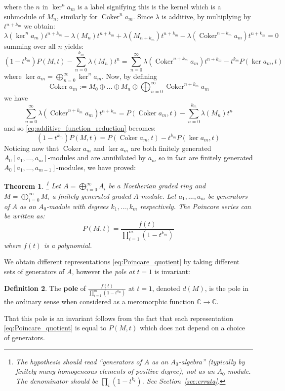 \documentclass[12pt]{article}
\theoremstyle{plain}
\newtheorem{thm}{Theorem}[subsection] %
\theoremstyle{definition}
\newtheorem{defn}[thm]{Definition} %
\newcommand{\bb}[1]{\mathbb{#1}}
\newcommand{\lto}{\longrightarrow}
\begin{document}
where the $n$ in $\ker^n a_m$ is a label signifying this is the kernel which is a submodule of $M_n$, similarly for $\operatorname{Coker}^n a_m$. Since $\lambda$ is additive, by multiplying by $t^{n+k_m}$ we obtain:
\[\lambda (\ker^n a_m)t^{n+k_m} - \lambda (M_n)t^{n+k_m} + \lambda (M_{n+k_m})t^{n+k_m} - \lambda (\operatorname{Coker}^{n + k_m} a_{m})t^{n + k_m} = 0\]
summing over all $n$ yields:
\begin{equation}
\label{eq:additive_function_reduction}
    (1 - t^{k_m})P(M,t) - \sum_{n = 0}^{k_m}\lambda(M_n)t^n = \sum_{n = 0}^\infty\lambda (\operatorname{Coker}^{n + k_m} a_{m})t^{n + k_m} - t^{k_m}P(\ker a_m, t)
\end{equation}
where $\ker a_m = \bigoplus_{n = 0}^\infty \ker^n a_m$. Now, by defining
\[\operatorname{Coker }a_m := M_0 \oplus \hdots \oplus M_n \oplus \bigoplus_{n = 0}^\infty \operatorname{Coker}^{n+k_m}a_m\]
we have
\[
\label{eq:clever_graded_module} \sum_{n = 0}^\infty\lambda (\operatorname{Coker}^{n + k_m} a_{m})t^{n + k_m} = P(\operatorname{Coker}a_m,t) - \sum_{n = 0}^{k_m}\lambda(M_n)t^n
\]
and so \eqref{eq:additive_function_reduction} becomes:
\begin{equation}
    \label{eq:generation_reduction} (1 - t^{k_m})P(M,t) = P(\operatorname{Coker}a_m,t) - t^{k_m}P(\ker a_m, t)
\end{equation}
Noticing now that $\operatorname{Coker}a_m$ and $\ker a_m$ are both finitely generated $A_0[a_1,...,a_m]$-modules and are annihilated by $a_m$ so in fact are finitely generated $A_0[a_1,...,a_{m-1}]$-modules, we have proved:
\begin{thm}
\label{thm:Hilbert_Serre}\footnote{The hypothesis should read ``generators of $A$ as an $A_0$-algebra'' (typically by finitely many homogeneous elements of positive degree), not as an $A_0$-module. The denominator should be $\prod_i(1-t^{k_i})$. See Section~\ref{sec:errata}.}
Let $A = \bigoplus_{i = 0}^\infty A_i$ be a Noetherian graded ring and $M = \bigoplus_{i = 0}^\infty M_i$ a finitely generated graded $A$-module. Let $a_1,...,a_m$ be generators of $A$ as an $A_0$-module with degrees $k_1,...,k_m$ respectively. The Poincare series can be written as:
\begin{equation}
\label{eq:Poincare_quotient}
P(M,t) = \frac{f(t)}{\prod_{i = 1}^m(1 - t^{k_m})}
\end{equation}
where $f(t)$ is a polynomial.
\end{thm}
We obtain different representations \eqref{eq:Poincare_quotient} by taking different sets of generators of $A$, however the \emph{pole at $t = 1$} is invariant:
\begin{defn}
The \textbf{pole} of $\frac{f(t)}{\prod_{i = 1}^m(1 - t^{k_m})}$ at $t = 1$, denoted $d(M)$, is the pole in the ordinary sense when considered as a meromorphic function $\bb{C} \lto \bb{C}$.
\end{defn}
That this pole is an invariant follows from the fact that each representation \eqref{eq:Poincare_quotient} is equal to $P(M,t)$ which does not depend on a choice of generators.
\end{document}
